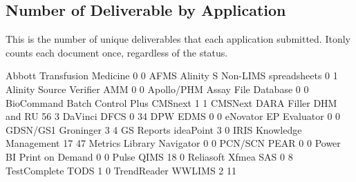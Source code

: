 \documentclass{article}
\begin{document}
\subsection{Number of Deliverable by Application}
This is the number of unique deliverables that each application submitted. Itonly counts
each document once, regardless of the status.
\begin{Schunk}
\begin{Soutput}
                                    Abbott Transfusion Medicine 
                              0                               0 
                           AFMS Alinity S Non-LIMS spreadsheets 
                              0                               1 
        Alinity Source Verifier                             AMM 
                              0                               0 
                     Apollo/PHM             Assay File Database 
                              0                               0 
  BioCommand Batch Control Plus                         CMSnext 
                              1                               1 
                        CMSNext          DARA Filler DHM and RU 
                             56                               3 
                        DaVinci                            DFCS 
                              0                              34 
                            DPW                            EDMS 
                              0                               0 
                       eNovator                    EP Evaluator 
                              0                               0 
                       GDSN/GS1                       Groninger 
                              3                               4 
                     GS Reports                       ideaPoint 
                              3                               0 
                           IRIS            Knowledge Management 
                             17                              47 
                Metrics Library                       Navigator 
                              0                               0 
                        PCN/SCN                            PEAR 
                              0                               0 
                       Power BI                 Print on Demand 
                              0                               0 
                          Pulse                            QIMS 
                             18                               0 
                Reliasoft Xfmea                             SAS 
                              0                               8 
                   TestComplete                            TODS 
                              1                               0 
                    TrendReader                          WWLIMS 
                              2                              11 
\end{Soutput}
\end{Schunk}
\end{document}

